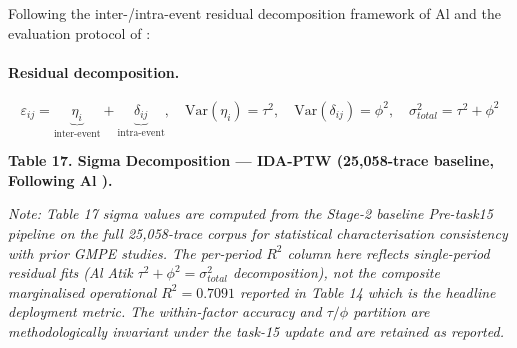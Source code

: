 \documentclass[10pt]{article}
\begin{document}
Following the inter-/intra-event residual decomposition framework of Al \citet{ref44} and the evaluation protocol of \citet{ref35}:

\paragraph{Residual decomposition.}

\[\varepsilon_{ij} = \underbrace{\eta_i}_{\text{inter-event}} + \underbrace{\delta_{ij}}_{\text{intra-event}}, \quad \text{Var}(\eta_i) = \tau^2, \quad \text{Var}(\delta_{ij}) = \phi^2, \quad \sigma_{total}^2 = \tau^2 + \phi^2\]

\begin{center}\fontsize{8}{10}\selectfont\textbf{Table 17. Sigma Decomposition --- IDA-PTW (25,058-trace baseline, Following Al \citet{ref44}).}\end{center}
\emph{Note: Table 17 sigma values are computed from the Stage-2 baseline Pre-task15 pipeline on the full 25,058-trace corpus for statistical characterisation consistency with prior GMPE studies. The per-period \(R^2\) column here reflects single-period residual fits (Al Atik \(\tau^2 + \phi^2 = \sigma_{total}^2\) decomposition), not the composite marginalised operational \(R^2 = 0.7091\) reported in Table 14 which is the headline deployment metric. The within-factor accuracy and \(\tau/\phi\) partition are methodologically invariant under the task-15 update and are retained as reported.}
\end{document}
